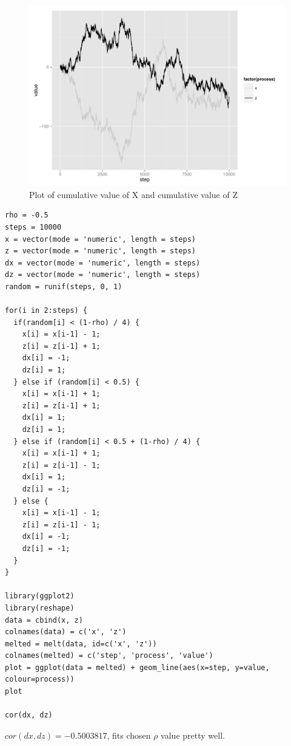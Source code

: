 \documentclass[11pt]{scrartcl}
\begin{document}
\begin{figure}[H]
\centering\includegraphics[width=\textwidth]{./hw5-bernoulli/bernoulli.pdf}
\caption{Plot of cumulative value of X and cumulative value of Z}
\end{figure}

\begin{lstlisting}
rho = -0.5
steps = 10000
x = vector(mode = 'numeric', length = steps)
z = vector(mode = 'numeric', length = steps)
dx = vector(mode = 'numeric', length = steps)
dz = vector(mode = 'numeric', length = steps)
random = runif(steps, 0, 1)

for(i in 2:steps) {
  if(random[i] < (1-rho) / 4) {
    x[i] = x[i-1] - 1;
    z[i] = z[i-1] + 1;
    dx[i] = -1;
    dz[i] = 1;
  } else if (random[i] < 0.5) {
    x[i] = x[i-1] + 1;
    z[i] = z[i-1] + 1;
    dx[i] = 1;
    dz[i] = 1;
  } else if (random[i] < 0.5 + (1-rho) / 4) {
    x[i] = x[i-1] + 1;
    z[i] = z[i-1] - 1;
    dx[i] = 1;
    dz[i] = -1;
  } else {
    x[i] = x[i-1] - 1;
    z[i] = z[i-1] - 1;
    dx[i] = -1;
    dz[i] = -1;
  }
}

library(ggplot2)
library(reshape)
data = cbind(x, z)
colnames(data) = c('x', 'z')
melted = melt(data, id=c('x', 'z'))
colnames(melted) = c('step', 'process', 'value')
plot = ggplot(data = melted) + geom_line(aes(x=step, y=value, colour=process))
plot

cor(dx, dz)
\end{lstlisting}

$cor(dx, dz) = -0.5003817$, fits chosen $\rho$ value pretty well.

\section{}
\end{document}
